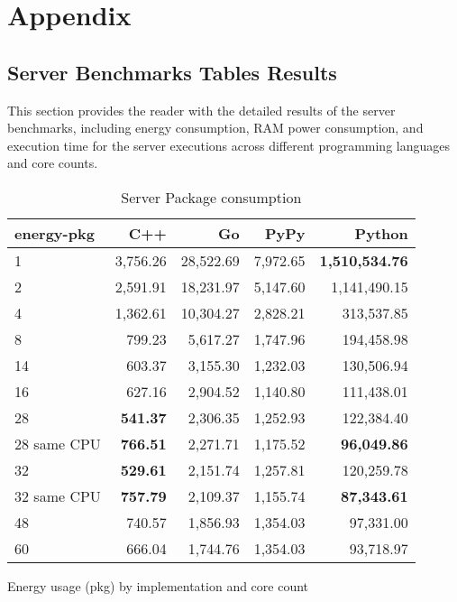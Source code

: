 \chapter{Appendix}\label{chap:appendix}


\section{Server Benchmarks Tables Results}

This section provides the reader with the detailed results of the server benchmarks, including energy consumption, RAM power consumption, and execution time for the server executions across different programming languages and core counts.

\begin{table}[H]
    \centering
    \begin{tabular}{lrrrr}
        \hline
        energy-pkg     & C++                & Go         & PyPy       & Python        \\
        \hline
        1              & 3,756.26            & 28,522.69   & 7,972.65   & \textbf{1,510,534.76}  \\
        2              & 2,591.91            & 18,231.97   & 5,147.60   & 1,141,490.15           \\
        4              & 1,362.61            & 10,304.27   & 2,828.21   &   313,537.85           \\
        8	           &   799.23 	         & 5,617.27    & 1,747.96   &	194,458.98           \\ 
        14             &   603.37            & 3,155.30    & 1,232.03   &   130,506.94           \\
        16             &   627.16            & 2,904.52    & 1,140.80   &   111,438.01           \\
        28             &   \textbf{541.37}   & 2,306.35    & 1,252.93   &   122,384.40           \\
        28 same CPU    &   \textbf{766.51}   & 2,271.71    & 1,175.52   &   \textbf{96,049.86}   \\
        32             &   \textbf{529.61}   & 2,151.74    & 1,257.81   &   120,259.78           \\
        32 same CPU    &   \textbf{757.79}   & 2,109.37    & 1,155.74   &   \textbf{87,343.61}   \\
        48             &   740.57            & 1,856.93    & 1,354.03   &    97,331.00           \\
        60             &   666.04            & 1,744.76    & 1,354.03   &    93,718.97           \\
        \hline
    \end{tabular}
\caption{Server Package consumption}{Energy usage (pkg) by implementation and core count}
\label{tab:server-energy-pkg}
\end{table}

